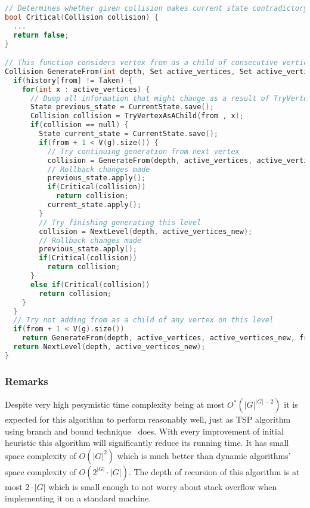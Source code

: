 \begin{lstlisting}[language=C++]
// Determines whether given collision makes current state contradictory with treedepth decomposition definition
bool Critical(Collision collision) {
  ...
  return false;
}

// This function considers vertex from as a child of consecutive vertices from active_vertices. At the time of calling this function, every vertex v < from has been considered on this level to some extent. Note that calling this function does not change current state i.e. after this function returns state is how it was before the call.
Collision GenerateFrom(int depth, Set active_vertices, Set active_vertices_new, int from) {
  if(history[from] != Taken) {
    for(int x : active_vertices) {
      // Dump all information that might change as a result of TryVertexAsAChild
      State previous_state = CurrentState.save();
      Collision collision = TryVertexAsAChild(from , x);
      if(collision == null) {
        State current_state = CurrentState.save();
        if(from + 1 < V(g).size()) {
          // Try continuing generation from next vertex
          collision = GenerateFrom(depth, active_vertices, active_vertices_new, from + 1);
          // Rollback changes made
          previous_state.apply();
          if(Critical(collision))
            return collision;
          current_state.apply();
        }
        // Try finishing generating this level
        collision = NextLevel(depth, active_vertices_new);
        // Rollback changes made
        previous_state.apply();
        if(Critical(collision))
          return collision;
      }
      else if(Critical(collision))
        return collision;
    }
  }
  // Try not adding from as a child of any vertex on this level
  if(from + 1 < V(g).size())
    return GenerateFrom(depth, active_vertices, active_vertices_new, from + 1);
  return NextLevel(depth, active_vertices_new);
}
\end{lstlisting}
\subsubsection{Remarks}
Despite very high pesymistic time complexity being at most $O^*\left(\left|G\right|^{\left|G\right|-2}\right)$ it is expected for this algorithm to perform reasonably well, just as TSP algorithm using branch and bound technique~\cite{tsp_bnb} does. With every improvement of initial heuristic this algorithm will significantly reduce its running time. It has small space complexity of $O\left(\left|G\right|^2\right)$ which is much better than dynamic algorithms' space complexity of $O\left(2^{\left|G\right|}\cdot\left|G\right|\right)$. The depth of recursion of this algorithm is at most $2\cdot\left|G\right|$ which is small enough to not worry about stack overflow when implementing it on a standard machine.
